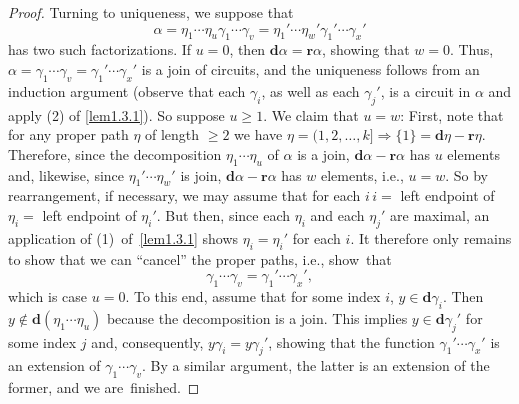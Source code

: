 \documentclass{surv-l}
\numberwithin{equation}{section}
\numberwithin{table}{section}
\numberwithin{figure}{section}
\theoremstyle{definition}
\begin{document}
\begin{proof}
Turning to uniqueness, we suppose that
\[
\alpha=\eta_{1}\cdots\eta_{u}\gamma_{1}\cdots\gamma_{v}
=\eta_{1}'\cdots\eta_{w}'\gamma_{1}'\cdots\gamma_{x}'
\]
has two such factorizations. If $u=0$, then
$\mathbf{d}\alpha=\mathbf{r}\alpha$, showing that $w=0$. Thus,
$\alpha=\gamma_{1}\cdots\gamma_{v}=\gamma_{1}'\cdots\gamma_{x}'$
is a join of circuits, and the uniqueness follows from an
induction argument (observe that each $\gamma_{i}$, as well as
each $\gamma_{j}'$, is a circuit in $\alpha$ and apply (2) of
\ref{lem1.3.1}). So suppose $u\geq 1$. We claim that $u=w$: First,
note that for any proper path $\eta$ of length $\geq 2$ we have
$\eta=(1,2,\ldots,
k]\Rightarrow\{1\}=\mathbf{d}\eta-\mathbf{r}\eta$. Therefore,
since the decomposition $\eta_{1}\cdots\eta_{u}$ of $\alpha$ is a
join, $\mathbf{d}\alpha-\mathbf{r}\alpha$ has $u$ elements and,
likewise, since $\eta_{1}'\cdots\eta_{w}'$ is join,
$\mathbf{d}\alpha-\mathbf{r}\alpha$ has $w$ elements, i.e., $u=w$.
So by rearrangement, if necessary, we may assume that for each
$i\,i=$ left endpoint of $\eta_{i}=$ left endpoint of $\eta_{i}'$.
But then, since each $\eta_{i}$ and each $\eta_{j}'$ are maximal,
an application of (1)~of~\ref{lem1.3.1} shows $\eta_{i}=\eta_{i}'$
for each $i$. It therefore only remains to show that we can
``cancel'' the proper paths, i.e., show~that
\[
\gamma_{1}\cdots\gamma_{v}=\gamma_{1}'\cdots\gamma_{x}',
\]
which is case $u=0$. To this end, assume that for some index
$i$, $y\in \mathbf{d}\gamma_{i}$. Then $y\not\in
\mathbf{d}(\eta_{1}\cdots\eta_{u})$ because the decomposition
is a join. This implies $y\in \mathbf{d}\gamma_{j}'$ for some
index $j$ and, consequently, $y\gamma_{i}=y\gamma_{j}'$,
showing that the function $\gamma_{1}'\cdots\gamma_{x}'$ is an
extension of $\gamma_{1}\cdots\gamma_{v}$. By a similar
argument, the latter is an extension of the former, and we
are~finished.
\end{proof}
\end{document}
